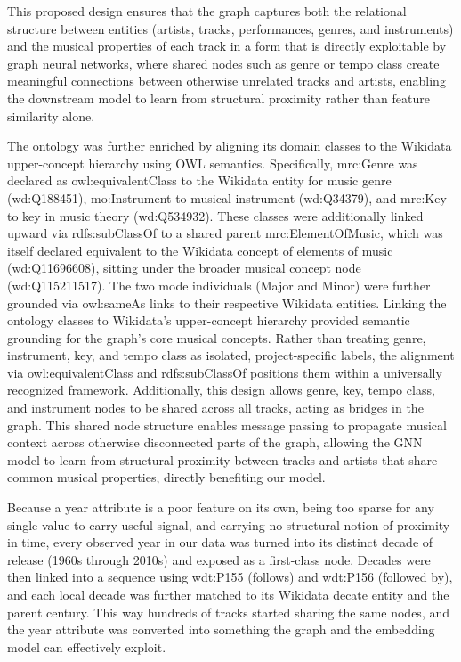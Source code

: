 This proposed design ensures that the graph captures both the relational structure between entities (artists, tracks, performances, genres, and instruments) and the musical properties of each track in a form that is directly exploitable by graph neural networks, where shared nodes such as genre or tempo class create meaningful connections between otherwise unrelated tracks and artists, enabling the downstream model to learn from structural proximity rather than feature similarity alone.

The ontology was further enriched by aligning its domain classes to the Wikidata upper-concept hierarchy using OWL semantics. Specifically, mrc:Genre was declared as owl:equivalentClass to the Wikidata entity for music genre (wd:Q188451), mo:Instrument to musical instrument (wd:Q34379), and mrc:Key to key in music theory (wd:Q534932). These classes were additionally linked upward via rdfs:subClassOf to a shared parent mrc:ElementOfMusic, which was itself declared equivalent to the Wikidata concept of elements of music (wd:Q11696608), sitting under the broader musical concept node (wd:Q115211517). The two mode individuals (Major and Minor) were further grounded via owl:sameAs links to their respective Wikidata entities. Linking the ontology classes to Wikidata's upper-concept hierarchy provided semantic grounding for the graph's core musical concepts. Rather than treating genre, instrument, key, and tempo class as isolated, project-specific labels, the alignment via owl:equivalentClass and rdfs:subClassOf positions them within a universally recognized framework. Additionally, this design allows genre, key, tempo class, and instrument nodes to be shared across all tracks, acting as bridges in the graph. This shared node structure enables message passing to propagate musical context across otherwise disconnected parts of the graph, allowing the GNN model to learn from structural proximity between tracks and artists that share common musical properties, directly benefiting our model.

Because a year attribute is a poor feature on its own, being too sparse for any single value to carry useful signal, and carrying no structural notion of proximity in time, every observed year in our data was turned into its distinct decade of release (1960s through 2010s) and exposed as a first-class node. Decades were then linked into a sequence using wdt:P155 (follows) and wdt:P156 (followed by), and each local decade was further matched to its Wikidata decate entity and the parent century. This way hundreds of tracks started sharing the same nodes, and the year attribute was converted into something the graph and the embedding model can effectively exploit. 


